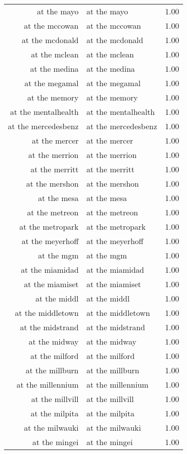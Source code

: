 \begin{table}[ht]
\begin{tabular}{rlr}
  at the mayo & at the mayo & 1.00 \\ 
  at the mccowan & at the mccowan & 1.00 \\ 
  at the mcdonald & at the mcdonald & 1.00 \\ 
  at the mclean & at the mclean & 1.00 \\ 
  at the medina & at the medina & 1.00 \\ 
  at the megamal & at the megamal & 1.00 \\ 
  at the memory & at the memory & 1.00 \\ 
  at the mentalhealth & at the mentalhealth & 1.00 \\ 
  at the mercedesbenz & at the mercedesbenz & 1.00 \\ 
  at the mercer & at the mercer & 1.00 \\ 
  at the merrion & at the merrion & 1.00 \\ 
  at the merritt & at the merritt & 1.00 \\ 
  at the mershon & at the mershon & 1.00 \\ 
  at the mesa & at the mesa & 1.00 \\ 
  at the metreon & at the metreon & 1.00 \\ 
  at the metropark & at the metropark & 1.00 \\ 
  at the meyerhoff & at the meyerhoff & 1.00 \\ 
  at the mgm & at the mgm & 1.00 \\ 
  at the miamidad & at the miamidad & 1.00 \\ 
  at the miamiset & at the miamiset & 1.00 \\ 
  at the middl & at the middl & 1.00 \\ 
  at the middletown & at the middletown & 1.00 \\ 
  at the midstrand & at the midstrand & 1.00 \\ 
  at the midway & at the midway & 1.00 \\ 
  at the milford & at the milford & 1.00 \\ 
  at the millburn & at the millburn & 1.00 \\ 
  at the millennium & at the millennium & 1.00 \\ 
  at the millvill & at the millvill & 1.00 \\ 
  at the milpita & at the milpita & 1.00 \\ 
  at the milwauki & at the milwauki & 1.00 \\ 
  at the mingei & at the mingei & 1.00 \\ 

\end{tabular}
\end{table}
